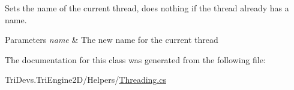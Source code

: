 Sets the name of the current thread, does nothing if the thread already has a name. 


\begin{DoxyParams}{Parameters}
{\em name} & The new name for the current thread\\
\hline
\end{DoxyParams}


The documentation for this class was generated from the following file\-:\begin{DoxyCompactItemize}
\item 
Tri\-Devs.\-Tri\-Engine2\-D/\-Helpers/\hyperlink{_threading_8cs}{Threading.\-cs}\end{DoxyCompactItemize}
